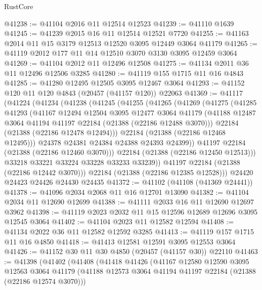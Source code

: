 \begin{lexlean}{RustCore}
\begin{coremodule}
@41238 := @41104 @2016 @11 @12514 @12523
@41239 := @41110 @1639
@41245 := @41239 @2015 @16 @11 @12514 @12521 @7720
@41255 := @41163 @2014 @11 @15 @3179 @12513 @12520 @3095 @12449 @3064 @41179
@41265 := @41119 @2012 @177 @11 @14 @12510 @3070 @3130 @3095 @12459 @3064
@41269 := @41104 @2012 @11 @12496 @12508
@41275 := @41134 @2011 @36 @11 @12496 @12506 @3285
@41280 := @41119 @155 @1715 @11 @16 @4843
@41285 := @41280 @12495 @12505 @3095 @12467 @3064
@41293 := @41152 @120 @11 @120 @4843 (@20457 (@41157 @120)) @22063
@41369 := @41117
    (@41224
      (@41234
        (@41238
          (@41245
            (@41255
              (@41265
                (@41269
                  (@41275
                    (@41285
                      @41293
                      (@41167
                        @12494
                        @12504
                        @3095
                        @12477
                        @3064
                        @41179
                        (@41188 @12487 @3064 @41194 @41197 @22184 (@21388 (@22186 @12488 @3070)))
                        @22184
                        (@21388 (@22186 @12478 @12494)))
                      @22184
                      (@21388 (@22186 @12468 @12495)))
                    @24378
                    @24381
                    @24384
                    @24388
                    @24393
                    @24399))
                @41197
                @22184
                (@21388 (@22186 @12460 @3070)))
              @22184
              (@21388 (@22186 @12450 @12513)))
            @33218
            @33221
            @33224
            @33228
            @33233
            @33239))
        @41197
        @22184
        (@21388 (@22186 @12442 @3070)))
      @22184
      (@21388 (@22186 @12385 @12528)))
    @24420
    @24423
    @24426
    @24430
    @24435
@41372 := @41102 (@41108 (@41369 @24441))
@41378 := @41096 @2034 @2068 @11 @16 @12701 @13090
@41382 := @41104 @2034 @11 @12690 @12699
@41388 := @41111 @2033 @16 @11 @12690 @12697 @3962
@41398 := @41119 @2023 @2032 @11 @15 @12596 @12689 @12696 @3095 @12545 @3064
@41402 := @41104 @2023 @11 @12582 @12594
@41408 := @41134 @2022 @36 @11 @12582 @12592 @3285
@41413 := @41119 @157 @1715 @11 @16 @4850
@41418 := @41413 @12581 @12591 @3095 @12553 @3064
@41426 := @41152 @30 @11 @30 @4850 (@20457 (@41157 @30)) @22110
@41463 := @41398
    (@41402
      (@41408
        (@41418
          @41426
          (@41167
            @12580
            @12590
            @3095
            @12563
            @3064
            @41179
            (@41188 @12573 @3064 @41194 @41197 @22184 (@21388 (@22186 @12574 @3070)))

\end{coremodule}
\end{lexlean}
